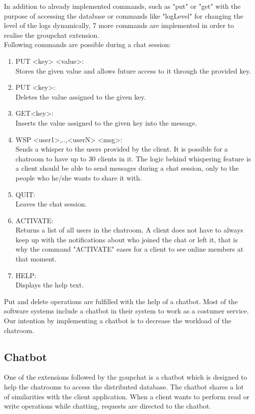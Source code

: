 In addition to already implemented commands, such as "put" or "get" with the purpose of accessing the database or commands like "logLevel" for changing the level of the logs dynamically, 7 more commands are implemented in order to realise the groupchat extension.\\
Following commands are possible during a chat session:
\begin{enumerate}
  \item 	PUT <key> <value>: \\
Stores the given value and allows future access to it through the provided key. 
  \item PUT <key>:\\
Deletes the value assigned to the given key.
  \item GET{<key>}:\\
Inserts the value assigned to the given key into the message.
  \item WSP <user1>,..,<userN> <msg>:\\
Sends a whisper to the users provided by the client. It is possible for a chatroom to have     up to 30 clients in it. The logic behind whispering feature is a client should be able to send messages during a chat session, only to the people who he/she wants to share it with.  
  \item QUIT:\\
  Leaves the chat session.
  \item ACTIVATE:\\
   Returns a list of all users in the chatroom. A client does not have to always keep up with the notifications about who joined the chat or left it, that is why the command "ACTIVATE" eases for a client to see online members at that moment.
  \item HELP:\\
  Displays the help text.
\end{enumerate}
Put and delete operations are fulfilled with the help of a chatbot. Most of the software systems include a chatbot in their system to work as a costumer service. Our intention by implementing a chatbot is to decrease the workload of the chatroom.

\subsection{Chatbot}
\label{sec:groupchat_chatbot}
One of the extensions followed by the goupchat is a chatbot which is designed to help the chatrooms to access the distributed database. The chatbot shares a lot of similarities with the client application. When a client wants to perform read or write operations while chatting, requests are directed to the chatbot.


